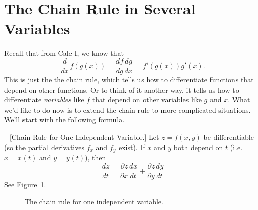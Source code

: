 \documentclass[10pt,]{book}
\theoremstyle{ptxplainnotitle}
\theoremstyle{ptxplaintitle}
\theoremstyle{ptxplainnotitle}
\theoremstyle{ptxplaintitle}
\theoremstyle{ptxplainnotitle}
\theoremstyle{ptxplaintitle}
\theoremstyle{ptxdefinitionnotitle}
\theoremstyle{ptxdefinitiontitle}
\theoremstyle{ptxdefinitionnotitle}
\theoremstyle{ptxdefinitiontitle}
\theoremstyle{ptxdefinitionnotitle}
\theoremstyle{ptxdefinitiontitle}
\theoremstyle{ptxdefinitionnotitle}
\theoremstyle{ptxdefinitiontitle}
\theoremstyle{ptxdefinitionnotitle}
\theoremstyle{ptxdefinitiontitle}
\numberwithin{equation}{section}
\newcommand{\dv}[3][]{\dfrac{d^{#1} #2}{d #3^{#1}}}
\newcommand{\pdv}[3][]{\dfrac{\partial^{#1} #2}{\partial #3^{#1}}}
\begin{document}
\section[{The Chain Rule in Several Variables}]{The Chain Rule in Several Variables}\label{section-the-chain-rule-in-several-variables}
\hypertarget{p-1041}{}%
Recall that from Calc I, we know that%
\begin{equation*}
\dv{}{x}f(g(x)) = \dv{f}{g}\dv{g}{x} = f'(g(x))g'(x).
\end{equation*}
This is just the the chain rule, which tells us how to differentiate functions that depend on other functions. Or to think of it another way, it tells us how to differentiate \emph{variables} like \(f\) that depend on other variables like \(g\) and \(x\). What we'd like to do now is to extend the chain rule to more complicated situations. We'll start with the following formula.%
\begin{theorem}+[{Chain Rule for One Independent Variable.}]\label{theorem-chain-rule-for-one-independent-variable}
\hypertarget{p-1042}{}%
Let \(z = f(x,y)\) be differentiable (so the partial derivatives \(f_{x}\) and \(f_{y}\) exist). If \(x\) and \(y\) both depend on \(t\) (i.e. \(x = x(t)\) and \(y = y(t)\)), then%
\begin{equation*}
\dv{z}{t} = \pdv{z}{x}\dv{x}{t} + \pdv{z}{y}\dv{y}{t}
\end{equation*}
See \hyperref[figure-chain-rule-one-independent-variable]{Figure~\ref{figure-chain-rule-one-independent-variable}}.%
\end{theorem}
\begin{figure}
\centering
{
}
\caption{The chain rule for one independent variable.\label{figure-chain-rule-one-independent-variable}}
\end{figure}
\end{document}
